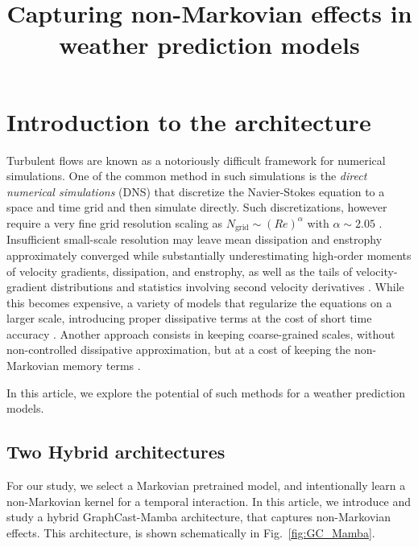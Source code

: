 \documentclass{article}
\title{Capturing non-Markovian effects in weather prediction models}
\author{
}
\begin{document}
\maketitle


\begin{abstract}
  
\end{abstract}



\section{Introduction to the architecture}
Turbulent flows are known as a notoriously difficult framework for numerical simulations. One of the common method in such simulations is the \textit{direct numerical simulations} (DNS) that discretize the Navier-Stokes equation to a space and time grid and then simulate directly. Such discretizations, however require a very fine grid resolution scaling as $N_{\textrm{grid}} \sim \left(Re\right)^{\alpha}$ with $\alpha \sim 2.05 $ \cite{yang2021grid}. Insufficient small-scale resolution may leave mean dissipation and enstrophy approximately converged while substantially underestimating high-order moments of velocity gradients, dissipation, and enstrophy, as well as the tails of velocity-gradient distributions and statistics involving second velocity derivatives \cite{DonzisResolutionEffects}.
 While this becomes expensive, a variety of models that regularize the equations on a larger scale, introducing proper dissipative terms at the cost of short time accuracy \cite{Wilson1996Review}. Another approach consists in keeping coarse-grained scales, without non-controlled dissipative approximation, but at a cost of keeping the non-Markovian memory terms \cite{YenTingLinMZ2021,de2026data}.

In this article, we explore the potential of such methods for a weather prediction models.
\subsection{Two Hybrid architectures}
For our study, we select a Markovian pretrained model, and intentionally learn a non-Markovian kernel for a temporal interaction. In this article, we introduce and study a hybrid GraphCast-Mamba architecture, that captures non-Markovian effects. This architecture, is shown schematically in Fig.~\ref{fig:GC_Mamba}. 
\end{document}
